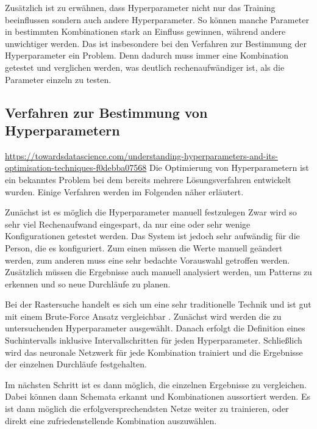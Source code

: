 Zusätzlich ist zu erwähnen, dass Hyperparameter nicht nur das Training beeinflussen sondern auch andere Hyperparameter. 
So können manche Parameter in bestimmten Kombinationen stark an Einfluss gewinnen, während andere unwichtiger werden.
Das ist insbesondere bei den Verfahren zur Bestimmung der Hyperparameter ein Problem.
Denn dadurch muss immer eine Kombination getestet und verglichen werden, was deutlich rechenaufwändiger ist, als die Parameter einzeln zu testen.


\subsection{Verfahren zur Bestimmung von Hyperparametern}
\label{chapter:verfahrenBestimmungHyperparameter}
\url{https://towardsdatascience.com/understanding-hyperparameters-and-its-optimisation-techniques-f0debba07568}
Die Optimierung von Hyperparametern ist ein bekanntes Problem bei dem bereits mehrere Lösungsverfahren entwickelt wurden.
Einige Verfahren werden im Folgenden näher erläutert.

Zunächst ist es möglich die Hyperparameter manuell festzulegen 
Zwar wird so sehr viel Rechenaufwand eingespart, da nur eine oder sehr wenige Konfigurationen getestet werden.
Das System ist jedoch sehr aufwändig für die Person, die es konfiguriert.
Zum einen müssen die Werte manuell geändert werden, zum anderen muss eine sehr bedachte Vorauswahl getroffen werden.
Zusätzlich müssen die Ergebnisse auch manuell analysiert werden, um Patterns zu erkennen und so neue Durchläufe zu planen.

Bei der Rastersuche handelt es sich um eine sehr traditionelle Technik und ist gut mit einem Brute-Force Ansatz vergleichbar \cite{hyperparameters-grid-search}.
Zunächst wird werden die zu untersuchenden Hyperparameter ausgewählt.
Danach erfolgt die Definition eines Suchintervalls inklusive Intervallschritten für jeden Hyperparameter.
Schließlich wird das neuronale Netzwerk für jede Kombination trainiert und die Ergebnisse der einzelnen Durchläufe festgehalten.
\newline

Im nächsten Schritt ist es dann möglich, die einzelnen Ergebnisse zu vergleichen.
Dabei können dann Schemata erkannt und Kombinationen aussortiert werden.
Es ist dann möglich die erfolgversprechendsten Netze weiter zu trainieren, oder direkt eine zufriedenstellende Kombination auszuwählen.
\newline

